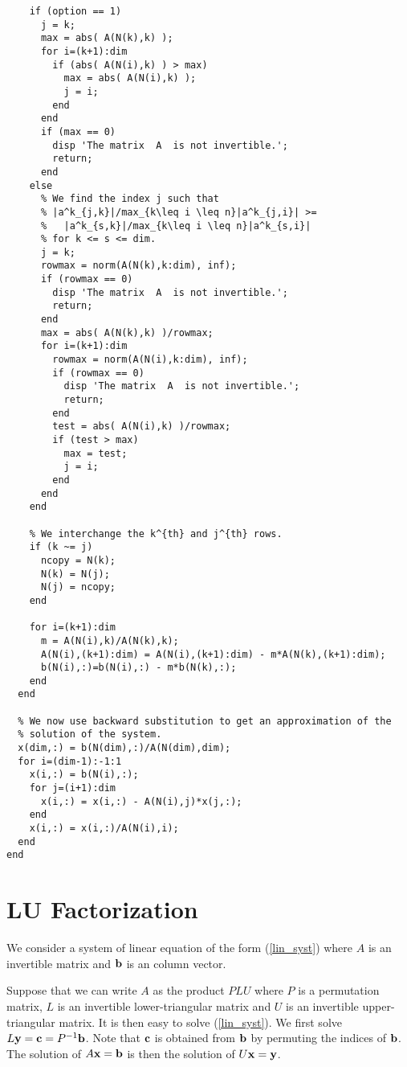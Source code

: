 \begin{code}
\begin{verbatim}
    if (option == 1)
      j = k;
      max = abs( A(N(k),k) );
      for i=(k+1):dim
        if (abs( A(N(i),k) ) > max)
          max = abs( A(N(i),k) );
          j = i;
        end
      end
      if (max == 0)
        disp 'The matrix  A  is not invertible.';
        return;
      end
    else
      % We find the index j such that
      % |a^k_{j,k}|/max_{k\leq i \leq n}|a^k_{j,i}| >=
      %   |a^k_{s,k}|/max_{k\leq i \leq n}|a^k_{s,i}|
      % for k <= s <= dim.
      j = k;
      rowmax = norm(A(N(k),k:dim), inf);
      if (rowmax == 0)
        disp 'The matrix  A  is not invertible.';
        return;
      end
      max = abs( A(N(k),k) )/rowmax;
      for i=(k+1):dim
        rowmax = norm(A(N(i),k:dim), inf);
        if (rowmax == 0)
          disp 'The matrix  A  is not invertible.';
          return;
        end
        test = abs( A(N(i),k) )/rowmax;
        if (test > max)
          max = test;
          j = i;
        end
      end
    end

    % We interchange the k^{th} and j^{th} rows.
    if (k ~= j)
      ncopy = N(k);
      N(k) = N(j);
      N(j) = ncopy;
    end

    for i=(k+1):dim
      m = A(N(i),k)/A(N(k),k);
      A(N(i),(k+1):dim) = A(N(i),(k+1):dim) - m*A(N(k),(k+1):dim);
      b(N(i),:)=b(N(i),:) - m*b(N(k),:);
    end
  end

  % We now use backward substitution to get an approximation of the
  % solution of the system.
  x(dim,:) = b(N(dim),:)/A(N(dim),dim);
  for i=(dim-1):-1:1
    x(i,:) = b(N(i),:);
    for j=(i+1):dim
      x(i,:) = x(i,:) - A(N(i),j)*x(j,:);
    end
    x(i,:) = x(i,:)/A(N(i),i);
  end
end
\end{verbatim}
\end{code}

\section{LU Factorization}

We consider a system of linear equation of the form (\ref{lin_syst})
where $A$ is an \nn invertible matrix and $\mathbf{b}$ is an
 column vector.

Suppose that we can write $A$ as the product $PLU$ where $P$ is a
permutation matrix, $L$ is an invertible lower-triangular matrix and
$U$ is an invertible upper-triangular matrix.  It is then easy to
solve (\ref{lin_syst}).  We first solve
$L\mathbf{y} = \mathbf{c} = P^{-1}\mathbf{b}$.  Note that $\mathbf{c}$ is
obtained from $\mathbf{b}$ by permuting the indices of $\mathbf{b}$.  The
solution of $A\mathbf{x}=\mathbf{b}$ is then the solution of $U\mathbf{x} = \mathbf{y}$.

